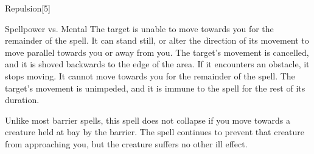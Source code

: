 \begin{spellsection}{Repulsion}[5]
    \begin{spellheader}
    \end{spellheader}
    \begin{spellcontent}
        \begin{spelltargetinginfo}
        \end{spelltargetinginfo}
        \begin{spelleffects}
            \begin{spellattack}{Spellpower vs. Mental}
                \spellsuccess The target is unable to move towards you for the remainder of the spell. It can stand still, or alter the direction of its movement to move parallel towards you or away from you.
                \spellcritical The target's movement is cancelled, and it is shoved backwards to the edge of the area.
                If it encounters an obstacle, it stops moving. It cannot move towards you for the remainder of the spell.
                \spellfailure The target's movement is unimpeded, and it is immune to the spell for the rest of its duration.
            \end{spellattack}
            \spelldur \durshort \dismissable
        \end{spelleffects}
    \end{spellcontent}
    \begin{spellfooter}
        \spellnotes Unlike most barrier spells, this spell does not collapse if you move towards a creature held at bay by the barrier. The spell continues to prevent that creature from approaching you, but the creature suffers no other ill effect.
        \miscastexplode
    \end{spellfooter}
\end{spellsection}

